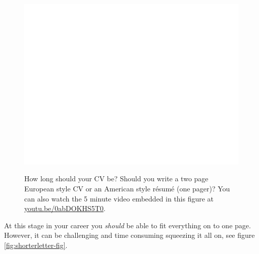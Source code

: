 \documentclass[
]{book}
\begin{document}
\begin{figure}

{\centering \href{https://www.youtube.com/embed/0abDOKHS5T0}{\includegraphics[width=0.99\linewidth]{cdyf_files/figure-latex/oneortwopager-fig-1} }

}

\caption{How long should your CV be? Should you write a two page European style CV or an American style résumé (one pager)? You can also watch the 5 minute video embedded in this figure at \href{https://youtu.be/0abDOKHS5T0}{youtu.be/0abDOKHS5T0}. \citep{youtube-resume-or-cv}}\label{fig:oneortwopager-fig}
\end{figure}



At this stage in your career you \emph{should} be able to fit everything on to one page. However, it can be challenging and time consuming squeezing it all on, see figure \ref{fig:shorterletter-fig}.
\end{document}
